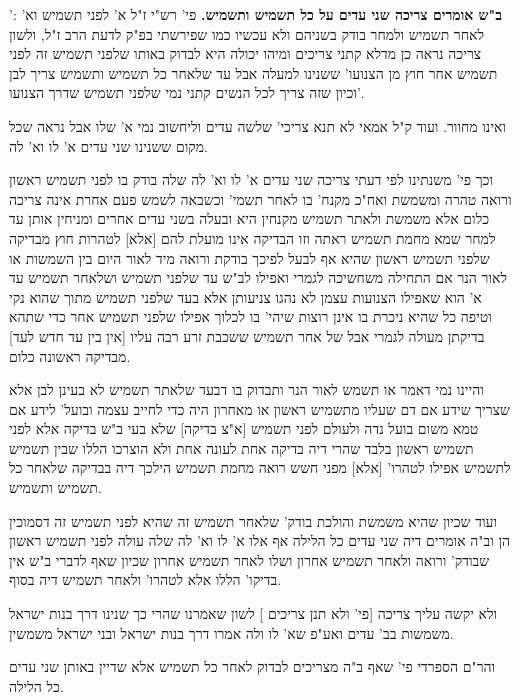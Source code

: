 \documentclass[12pt, openany]{book}
\begin{document}
{': \textbf{ב"ש אומרים צריכה שני עדים על כל תשמיש ותשמיש.}  פי' רש"י ז"ל א' לפני תשמיש וא' לאחר תשמיש ולמחר בודק בשניהם ולא עכשיו כמו שפירשתי בפ"ק לדעת הרב ז"ל, ולשון צריכה נראה כן מדלא קתני צריכים ומיהו יכולה היא לבדוק באותו שלפני תשמיש זה לפני תשמיש אחר חוץ מן הצנועו' ששנינו למעלה אבל עד שלאחר כל תשמיש ותשמיש צריך לבן וכיון שזה צריך לכל הנשים קתני נמי שלפני תשמיש שדרך הצנועו'.\par ואינו מחוור. ועוד ק"ל אמאי לא תנא צריכי' שלשה עדים וליחשוב נמי א' שלו אבל נראה שכל מקום ששנינו שני עדים א' לו וא' לה.\par  וכך פי' משנתינו לפי דעתי צריכה שני עדים א' לו וא' לה שלה בודק בו לפני תשמיש ראשון ורואה טהרה ומשמשת ואח"כ מקנח' בו לאחר תשמי' וכשבאה לשמש פעם אחרת אינה צריכה כלום אלא משמשת ולאתר תשמיש מקנחין היא ובעלה בשני עדים אחרים ומניחין אותן עד למחר שמא מחמת תשמיש ראתה וזו הבדיקה אינו מועלת להם [אלא] לטהרות חוץ מבדיקה שלפני תשמיש ראשון שהיא אף לבעל לפיכך בודקת ורואה מיד לאור היום בין השמשות או לאור הנר אם התחילה משחשיכה לגמרי ואפילו לב"ש עד שלפני תשמיש ושלאחר תשמיש עד א' הוא שאפילו הצנועות עצמן לא נהגו צניעותן אלא בעד שלפני תשמיש מתוך שהוא נקי וטיפה כל שהיא ניכרת בו אינן רוצות שיהי' בו לכלוך אפילו שלפני תשמיש אחר כדי שתהא בדיקתן מעולה לגמרי אבל של אחר תשמיש ששכבת זרע רבה עליו [אין בין עד חדש לעד] מבדיקה ראשונה כלום.\par והיינו נמי דאמר או תשמש לאור הנר ותבדוק בו דבעד שלאתר תשמיש לא בעינן לבן אלא שצריך שידע אם דם שעליו מתשמיש ראשון או מאחרון היה כדי לחייב עצמה ובועל' לידע אם טמא משום בועל נדה ולעולם לפני תשמיש [א"צ בדיקה] שלא בעי ב"ש בדיקה אלא לפני תשמיש ראשון בלבד שהרי דיה בדיקה אחת לעונה אחת ולא הוצרכו הללו שבין תשמיש לתשמיש אפילו לטהרו' [אלא] מפני חשש רואה מחמת תשמיש הילכך דיה בבדיקה שלאחר כל תשמיש ותשמיש.\par ועוד שכיון שהיא משמשת והולכת בודק' שלאחר תשמיש זה שהיא לפני תשמיש זה דסמוכין הן וב"ה אומרים דיה שני עדים כל הלילה אף אלו א' לו וא' לה שלה עולה לפני תשמיש ראשון שבודק' ורואה ולאחר תשמיש אחרון ושלו לאחר תשמיש אחרון שכיון שאף לדברי ב"ש אין בדיקו' הללו אלא לטהרו' ולאחר תשמיש דיה בסוף.\par  ולא יקשה עליך צריכה [{\small פי' ולא תנן צריכים} ] לשון שאמרנו שהרי כך שנינו דרך בנות ישראל משמשות בב' עדים ואע"פ שא' לו ולה אמרו דרך בנות ישראל ובני ישראל משמשין.\par  והר"ם הספרדי פי' שאף ב"ה מצריכים לבדוק לאחר כל תשמיש אלא שדיין באותן שני עדים כל הלילה. 
}
\end{document}
